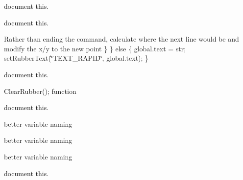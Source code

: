 \begin{DoxyRefList}
\label{todo__todo000098}%
%
document this. 
\item[Member \mbox{\hyperlink{imgui__main_8c_ae8fc4936b9433951a74c8f9bc667c246}{single\+\_\+line\+\_\+text\+\_\+main}} (void)]\label{todo__todo000220}%
%
document this.  
\item[Member \mbox{\hyperlink{imgui__main_8c_a9b5b21ae873aa1064eb16284d548fa11}{single\+\_\+line\+\_\+text\+\_\+prompt}} (Ui\+Object $\ast$global, const char $\ast$str)]\label{todo__todo000221}%
%
Rather than ending the command, calculate where the next line would be and modify the x/y to the new point \} \} else \{ global.\+text = str; set\+Rubber\+Text(\char`\"{}\+TEXT\+\_\+\+RAPID\char`\"{}, global.\+text); \}  
\item[Member \mbox{\hyperlink{imgui__main_8c_a5307d28a0ab917195f11a89a0dd1e265}{snowflake\+\_\+main}} ()]\label{todo__todo000222}%
%
document this.  
\item[Member \mbox{\hyperlink{imgui__main_8c_a2bace01becf7a93818045d13d18863db}{spare\+\_\+rubber\+\_\+action}} (void)]\label{todo__todo000141}%
%
Clear\+Rubber(); function  
\item[Member \mbox{\hyperlink{imgui__main_8c_a33a7499d857fd607ce2627e8c02dbc9c}{stub\+\_\+testing\+\_\+action}} (void)]\label{todo__todo000163}%
%
document this.  
\item[Member \mbox{\hyperlink{struct_sub_descriptor___affb2c75b7f632338f368aafab49f678d}{Sub\+Descriptor\+\_\+\+::color\+Code}} ]\label{todo__todo000233}%
%
better variable naming  
\item[Member \mbox{\hyperlink{struct_sub_descriptor___a0cfe04519ff6dab092ee7c002e55e520}{Sub\+Descriptor\+\_\+\+::some\+Int}} ]\label{todo__todo000231}%
%
better variable naming  
\item[Member \mbox{\hyperlink{struct_sub_descriptor___a6154b0f4ec7815c6d26c71852506418e}{Sub\+Descriptor\+\_\+\+::some\+Other\+Int}} ]\label{todo__todo000232}%
%
better variable naming  
\item[Member \mbox{\hyperlink{imgui__main_8c_af86b9a09f0e60cde3079b2007609e931}{text\+\_\+multi\+\_\+action}} (void)]\label{todo__todo000142}%
%
document this.  
\item[Member \mbox{\hyperlink{imgui__main_8c_ac78157cd935e95f0cbbe5924f7350230}{text\+\_\+single\+\_\+action}} (void)]\label{todo__todo000143}%

\end{DoxyRefList}
